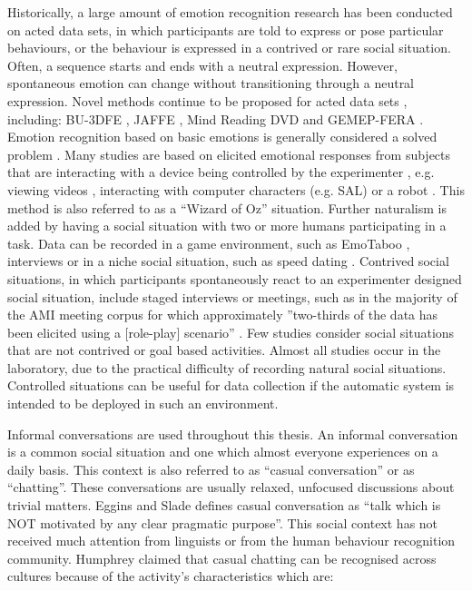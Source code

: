 Historically, a large amount of emotion recognition research has been conducted on acted data sets, in which participants are told to express or pose particular behaviours, or the behaviour is expressed in a contrived or rare social situation. Often, a sequence starts and ends with a neutral expression. However, spontaneous emotion can change without transitioning through a neutral expression. Novel methods continue to be proposed for acted data sets \cite{Chew2012b}, including: {BU-3DFE} \cite{Moore2009}, {JAFFE} \cite{He2005}, Mind Reading {DVD} \cite{Kaliouby2005} \cite{SobolShikler2010} and {GEMEP}-{FERA} \cite{Valstar2011}. Emotion recognition based on basic emotions is generally considered a solved problem \cite{Valstar2012}. Many studies are based on elicited emotional responses from subjects that are interacting with a device being controlled by the experimenter \cite{Afzal2009}, e.g. viewing videos \cite{Sun2004, Pfister2011}, interacting with computer characters (e.g. SAL) \cite{Wollmer2009} or a robot \cite{Seppi2008}. This method is also referred to as a ``Wizard of Oz'' situation. Further naturalism is added by having a social situation with two or more humans participating in a task. Data can be recorded in a game environment, such as EmoTaboo \cite{Zara2007}, interviews \cite{Cowie2009} or in a niche social situation, such as speed dating \cite{Madan2005}. Contrived social situations, in which participants spontaneously react to an experimenter designed social situation, include staged interviews \cite{Zeng2006} or meetings, such as in the majority of the AMI meeting corpus \cite{Carletta2007} for which approximately ''two-thirds of the data has been elicited using a [role-play] scenario'' \cite{amiproject}. Few studies consider social situations that are not contrived or goal based activities. Almost all studies occur in the laboratory, due to the practical difficulty of recording natural social situations. Controlled situations can be useful for data collection if the automatic system is intended to be deployed in such an environment. %

Informal conversations are used throughout this thesis. An informal conversation is a common social situation and one which almost everyone experiences on a daily basis. This context is also referred to as ``casual conversation'' or as ``chatting''. These conversations are usually relaxed, unfocused discussions about trivial matters. Eggins and Slade \cite{Eggins1997} defines casual conversation as ``talk which is NOT motivated by any clear pragmatic purpose''. This social context has not received much attention from linguists or from the human behaviour recognition community. Humphrey claimed that casual chatting can be recognised across cultures because of the activity's characteristics \cite{Humphrey1993} which are:

